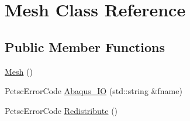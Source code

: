 \hypertarget{class_mesh}{}\section{Mesh Class Reference}
\label{class_mesh}
\subsection*{Public Member Functions}
\begin{DoxyCompactItemize}
\item 
\mbox{\hyperlink{class_mesh_a2af137f1571af89172b9c102302c416b}{Mesh}} ()
\item 
Petsc\+Error\+Code \mbox{\hyperlink{class_mesh_aa381581e1c9fe95f438d4a66c4291a5f}{Abaqus\+\_\+\+IO}} (std\+::string \&fname)
\item 
Petsc\+Error\+Code \mbox{\hyperlink{class_mesh_a69a626f34e07b13615847d2d3028f20b}{Redistribute}} ()
\end{DoxyCompactItemize}
